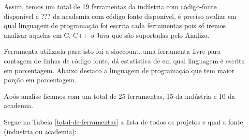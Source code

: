 \documentclass[qual, classic, a4paper]{ufbathesis}
\begin{document}
Assim, temos um total de 19 ferramentas da indústria com código-fonte
disponível e ??? da academia com código fonte disponível, é preciso avaliar em
qual linguagem de programação foi escrita cada ferramentas pois só iremos
analisar aquelas em C, C++ o Java que são suportadas pelo Analizo.

Ferramenta utilizada para isto foi a sloccount, uma ferramenta livre para
contagem de linhas de código fonte, dá estatística de em qual linguagem
é escrita em porcentagem. Abaixo destaco a linguagem de programação que
tem maior porção em porcentagem.

Após analise ficamos com um total de 25 ferramentas, 15 da indústria e 10 da
academia.

Segue na Tabela \ref{total-de-ferramentas} a lista de todos os projetos e qual
a fonte (industria ou academia):
\end{document}
